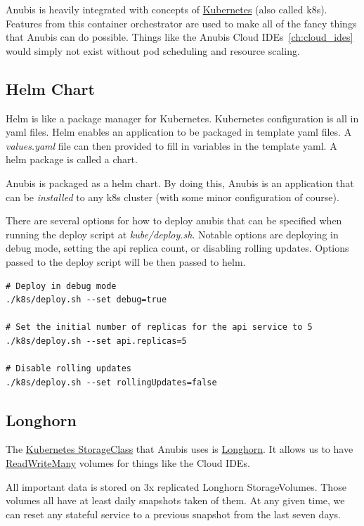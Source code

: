 Anubis is heavily integrated with concepts of \href{https://kubernetes.io/}{Kubernetes} (also called k8s).
Features from this container orchestrator are used to make all of the fancy things
that Anubis can do possible.
Things like the Anubis Cloud IDEs~\ref{ch:cloud_ides} would simply not exist
without pod scheduling and resource scaling.

\subsection{Helm Chart}\label{subsec:helm-chart}

Helm is like a package manager for Kubernetes.
Kubernetes configuration is all in yaml files.
Helm enables an application to be packaged in template yaml files.
A \textit{values.yaml} file can then provided to fill in variables in the template yaml.
A helm package is called a chart.

Anubis is packaged as a helm chart.
By doing this, Anubis is an application that can be \textit{installed} to any k8s cluster
(with some minor configuration of course).

There are several options for how to deploy anubis that can be specified when running 
the deploy script at \textit{kube/deploy.sh}. 
Notable options are deploying in debug mode, setting the api replica count, or disabling rolling updates.
Options passed to the deploy script will be then passed to helm.

\begin{verbatim}
# Deploy in debug mode
./k8s/deploy.sh --set debug=true

# Set the initial number of replicas for the api service to 5
./k8s/deploy.sh --set api.replicas=5

# Disable rolling updates
./k8s/deploy.sh --set rollingUpdates=false
\end{verbatim}

\subsection{Longhorn}\label{subsec:longhorn}

The \href{https://kubernetes.io/docs/concepts/storage/storage-classes/}{Kubernetes StorageClass} 
that Anubis uses is \href{https://longhorn.io/}{Longhorn}.
It allows us to have \href{https://kubernetes.io/docs/concepts/storage/persistent-volumes/#access-modes}{ReadWriteMany}
volumes for things like the Cloud IDEs.

All important data is stored on 3x replicated Longhorn StorageVolumes.
Those volumes all have at least daily snapshots taken of them.
At any given time, we can reset any stateful service to a previous snapshot from the last seven days.

